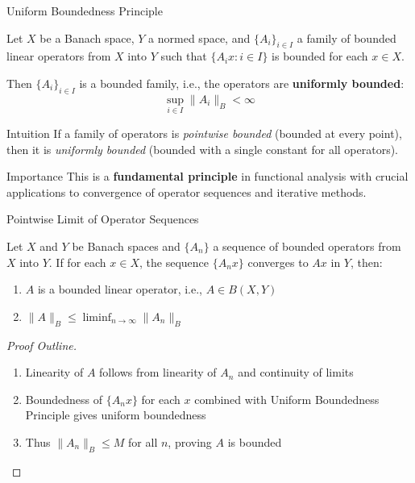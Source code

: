 \documentclass[aspectratio=169,10pt]{beamer}
\begin{document}
\begin{frame}{Uniform Boundedness Principle}
    \begin{theorem}[Theorem 1.14]
        Let $X$ be a Banach space, $Y$ a normed space, and $\{A_i\}_{i \in I}$ a family of bounded linear operators from $X$ into $Y$ such that $\{A_i x : i \in I\}$ is bounded for each $x \in X$.
    \end{theorem}

    Then $\{A_i\}_{i \in I}$ is a bounded family, i.e., the operators are \textbf{uniformly bounded}:
    $$\sup_{i \in I} \|A_i\|_B < \infty$$

    \vspace{0.5cm}

    \begin{block}{Intuition}
        If a family of operators is \textit{pointwise bounded} (bounded at every point), then it is \textit{uniformly bounded} (bounded with a single constant for all operators).
    \end{block}

    \vspace{0.3cm}

    \begin{alertblock}{Importance}
        This is a \textbf{fundamental principle} in functional analysis with crucial applications to convergence of operator sequences and iterative methods.
    \end{alertblock}
\end{frame}

\begin{frame}{Pointwise Limit of Operator Sequences}
    \begin{theorem}[Theorem 1.15]
        Let $X$ and $Y$ be Banach spaces and $\{A_n\}$ a sequence of bounded operators from $X$ into $Y$. If for each $x \in X$, the sequence $\{A_n x\}$ converges to $Ax$ in $Y$, then:
    \end{theorem}

    \begin{enumerate}
        \item $A$ is a bounded linear operator, i.e., $A \in B(X, Y)$
        \item $\|A\|_B \leq \liminf_{n \to \infty} \|A_n\|_B$
    \end{enumerate}

    \vspace{0.5cm}

    \begin{proof}[Proof Outline]
        \begin{enumerate}
            \item Linearity of $A$ follows from linearity of $A_n$ and continuity of limits
            \item Boundedness of $\{A_n x\}$ for each $x$ combined with Uniform Boundedness Principle gives uniform boundedness
            \item Thus $\|A_n\|_B \leq M$ for all $n$, proving $A$ is bounded
        \end{enumerate}
    \end{proof}
\end{frame}
\end{document}
